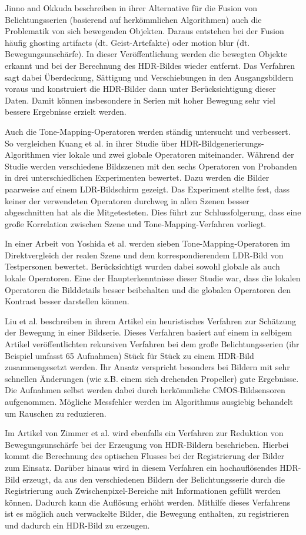 Jinno and Okkuda \cite{Jinno} beschreiben in ihrer Alternative für die Fusion von Belichtungsserien (basierend auf herkömmlichen Algorithmen) auch die Problematik von sich bewegenden Objekten. Daraus entstehen bei der Fusion häufig ghosting artifacts (dt. Geist-Artefakte) oder motion blur (dt. Bewegungsunschärfe). In dieser Veröffentlichung werden die bewegten Objekte erkannt und bei der Berechnung des \gls{HDR}-Bildes wieder entfernt. Das Verfahren sagt dabei Überdeckung, Sättigung und Verschiebungen in den Ausgangsbildern voraus und konstruiert die \gls{HDR}-Bilder dann unter Berücksichtigung dieser Daten. Damit können insbesondere in Serien mit hoher Bewegung sehr viel bessere Ergebnisse erzielt werden.

Auch die \gls{Tone-Mapping}-Operatoren werden ständig untersucht und verbessert. So vergleichen Kuang et al. \cite{tone_mapper_2} in ihrer Studie über \gls{HDR}-Bildgenerierungs-Algorithmen vier lokale und zwei globale Operatoren miteinander. Während der Studie werden verschiedene Bildszenen mit den sechs Operatoren von Probanden in drei unterschiedlichen Experimenten bewertet. Dazu werden die Bilder paarweise auf einem \gls{LDR}-Bildschirm gezeigt. Das Experiment stellte fest, dass keiner der verwendeten Operatoren durchweg in allen Szenen besser abgeschnitten hat als die Mitgetesteten. Dies führt zur Schlussfolgerung, dass eine große Korrelation zwischen Szene und \gls{Tone-Mapping}-Verfahren vorliegt. 

In einer Arbeit von Yoshida et al. \cite{tone_mapper_1} werden sieben \gls{Tone-Mapping}-Operatoren im Direktvergleich der realen Szene und dem korrespondierendem \gls{LDR}-Bild von Testpersonen bewertet. Berücksichtigt wurden dabei sowohl globale als auch lokale Operatoren. Eine der Haupterkenntnisse dieser Studie war, dass die lokalen Operatoren die Bilddetails besser beibehalten und die globalen Operatoren den Kontrast besser darstellen können.

Liu et al. \cite{Xinqiao} beschreiben in ihrem Artikel ein heuristisches Verfahren zur Schätzung der Bewegung in einer Bildserie. Dieses Verfahren basiert auf einem in selbigem Artikel veröffentlichten rekursiven Verfahren bei dem große Belichtungsserien (ihr Beispiel umfasst 65 Aufnahmen) Stück für Stück zu einem \gls{HDR}-Bild zusammengesetzt werden. Ihr Ansatz verspricht besonders bei Bildern mit sehr schnellen Änderungen (wie z.B. einem sich drehenden Propeller) gute Ergebnisse. Die Aufnahmen selbst werden dabei durch herkömmliche \gls{CMOS}-Bildsensoren aufgenommen. Mögliche Messfehler werden im Algorithmus ausgiebig behandelt um Rauschen zu reduzieren.

Im Artikel von Zimmer et al. \cite{zimmer} wird ebenfalls ein Verfahren zur Reduktion von Bewegungsunschärfe bei der Erzeugung von \gls{HDR}-Bildern beschrieben. Hierbei kommt die Berechnung des optischen Flusses bei der Registrierung der Bilder zum Einsatz. Darüber hinaus wird in diesem Verfahren ein hochauflösendes \gls{HDR}-Bild erzeugt, da aus den verschiedenen Bildern der Belichtungsserie durch die Registrierung auch Zwischenpixel-Bereiche mit Informationen gefüllt werden können. Dadurch kann die Auflösung erhöht werden. Mithilfe dieses Verfahrens ist es möglich auch verwackelte Bilder, die Bewegung enthalten, zu registrieren und dadurch ein \gls{HDR}-Bild zu erzeugen.
